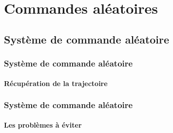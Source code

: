 \section{Commandes aléatoires}
\subsection{Système de commande aléatoire}

\begin{frame}
 \frametitle{Système de commande aléatoire}
 \framesubtitle{Récupération de la trajectoire}
 
\end{frame}

\begin{frame}
 \frametitle{Système de commande aléatoire}
 \framesubtitle{Les problèmes à éviter}
 
\end{frame}
